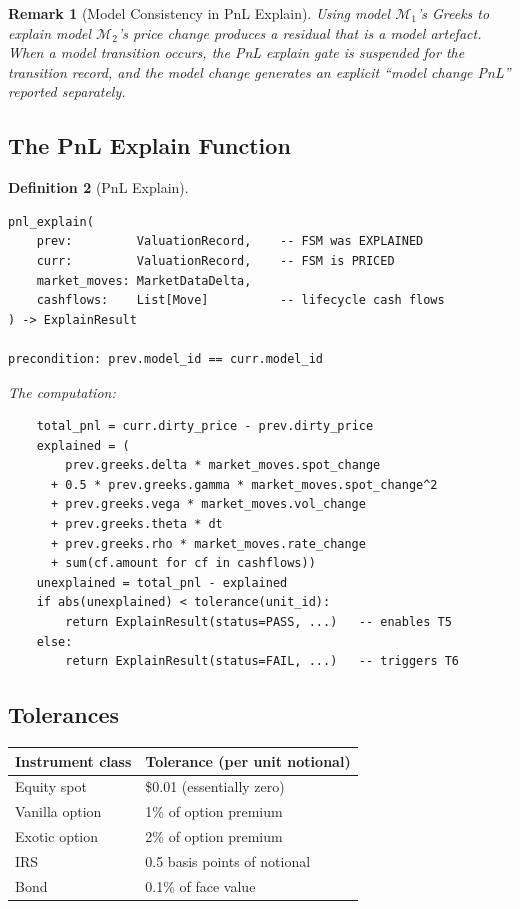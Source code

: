 \documentclass[11pt,a4paper]{article}
\newtheorem{definition}{Definition}[section]
\newtheorem{remark}[definition]{Remark}
\begin{document}
\begin{remark}[Model Consistency in PnL Explain]
\label{rem:model-consistency}
Using model $\mathcal{M}_1$'s Greeks to explain model $\mathcal{M}_2$'s price change produces a residual that is a model artefact.  When a model transition occurs, the PnL explain gate is suspended for the transition record, and the model change generates an explicit ``model change PnL'' reported separately.
\end{remark}

\subsection{The PnL Explain Function}

\begin{definition}[PnL Explain]
\label{def:pnl-explain}
\begin{lstlisting}
pnl_explain(
    prev:         ValuationRecord,    -- FSM was EXPLAINED
    curr:         ValuationRecord,    -- FSM is PRICED
    market_moves: MarketDataDelta,
    cashflows:    List[Move]          -- lifecycle cash flows
) -> ExplainResult

precondition: prev.model_id == curr.model_id
\end{lstlisting}

The computation:
\begin{lstlisting}
    total_pnl = curr.dirty_price - prev.dirty_price
    explained = (
        prev.greeks.delta * market_moves.spot_change
      + 0.5 * prev.greeks.gamma * market_moves.spot_change^2
      + prev.greeks.vega * market_moves.vol_change
      + prev.greeks.theta * dt
      + prev.greeks.rho * market_moves.rate_change
      + sum(cf.amount for cf in cashflows))
    unexplained = total_pnl - explained
    if abs(unexplained) < tolerance(unit_id):
        return ExplainResult(status=PASS, ...)   -- enables T5
    else:
        return ExplainResult(status=FAIL, ...)   -- triggers T6
\end{lstlisting}
\end{definition}

\subsection{Tolerances}

\begin{center}
\small
\begin{tabular}{l l}
\toprule
\textbf{Instrument class} & \textbf{Tolerance (per unit notional)} \\
\midrule
Equity spot & \$0.01 (essentially zero) \\
Vanilla option & 1\% of option premium \\
Exotic option & 2\% of option premium \\
IRS & 0.5 basis points of notional \\
Bond & 0.1\% of face value \\
\bottomrule
\end{tabular}
\end{center}
\end{document}
